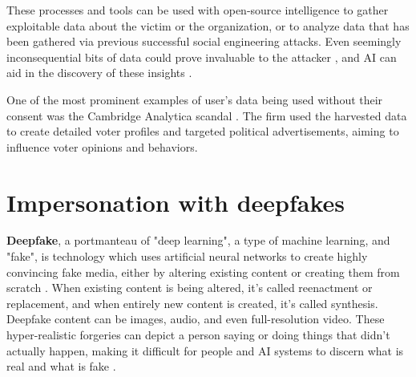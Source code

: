 These processes and tools can be used with open-source intelligence to gather exploitable data about the victim or the organization, or to analyze data that has been gathered via previous successful social engineering attacks. Even seemingly inconsequential bits of data could prove invaluable to the attacker \citep{mitnickArtDeceptionControlling2003}, and AI can aid in the discovery of these insights \citep{blauthArtificialIntelligenceCrime2022}.

One of the most prominent examples of user's data being used without their consent was the Cambridge Analytica scandal \citep{blauthArtificialIntelligenceCrime2022}. The firm used the harvested data to create detailed voter profiles and targeted political advertisements, aiming to influence voter opinions and behaviors.













\section{Impersonation with deepfakes}
\begin{comment}
Deepfake-generated content

What to cover:
    - What is a deepfake
    - Deepfakeja ei käsitely aiemmin? Generative AI kappaleessa?
    - Seuraava section kertoo tietojenkalastelusta ja sitoo chatbotit, automated intelligence gathering ja nää deepfaket yhteen kokonaisuudeksi

\end{comment}

\textbf{Deepfake}, a portmanteau of "deep learning", a type of machine learning, and "fake", is technology which uses artificial neural networks to create highly convincing fake media, either by altering existing content or creating them from scratch \citep{mirskyTheCreationAndDetectionOfDeepfakes2021}. When existing content is being altered, it's called reenactment or replacement, and when entirely new content is created, it's called synthesis. Deepfake content can be images, audio, and even full-resolution video. These hyper-realistic forgeries can depict a person saying or doing things that didn't actually happen, making it difficult for people and AI systems to discern what is real and what is fake \citep{blauthArtificialIntelligenceCrime2022}.


